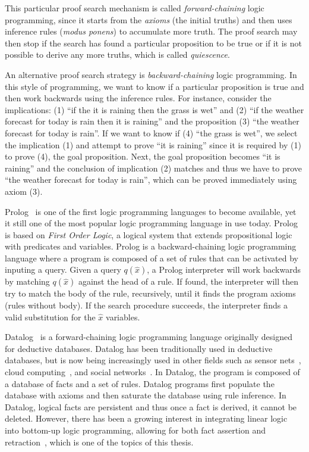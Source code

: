 This particular proof search mechanism is called \emph{forward-chaining} logic
programming, since it starts from the \emph{axioms} (the initial truths) and
then uses inference rules (\emph{modus ponens}) to accumulate more truth. The
proof search may then stop if the search has found a particular proposition to
be true or if it is not possible to derive any more truths, which is called
\emph{quiescence}.

An alternative proof search strategy is \emph{backward-chaining} logic
programming. In this style of programming, we want to know if a particular
proposition is true and then work backwards using the inference rules. For
instance, consider the implications: (1) ``if the it is raining then the grass
is wet'' and (2) ``if the weather forecast for today is rain then it is raining''
and the proposition (3) ``the weather forecast for today is rain''. If we want
to know if (4) ``the grass is wet'', we select the implication (1) and attempt to prove
``it is raining'' since it is required by (1) to prove (4), the goal
proposition. Next, the goal proposition becomes ``it is raining'' and the
conclusion of implication (2) matches and thus we have to prove ``the weather
forecast for today is rain'', which can be proved immediately using axiom (3).

Prolog~\cite{Colmerauer:1993:BP:154766.155362} is one of the first logic
programming languages to become available, yet it still one of the most popular
logic programming language in use today. Prolog is based on \emph{First Order
Logic}, a logical system that extends propositional logic with predicates and
variables. Prolog is a backward-chaining logic programming language where a
program is composed of a set of rules that can be activated by inputing a query.
Given a query $q(\hat{x})$, a Prolog interpreter will work backwards by matching
$q(\hat{x})$ against the head of a rule. If found, the interpreter will then try
to match the body of the rule, recursively, until it finds the program axioms
(rules without body). If the search procedure succeeds, the interpreter finds a
valid substitution for the $\hat{x}$ variables.

Datalog~\cite{Ramakrishnan93asurvey,Ullman:1990:PDK:533142} is a
forward-chaining logic programming language originally designed for deductive
databases. Datalog has been traditionally used in deductive databases, but is
now being increasingly used in other fields such as sensor
nets~\cite{Chu:2007:DID:1322263.1322281}, cloud computing~\cite{alvaro:boom},
and social networks~\cite{Seo:2013:DSD:2556549.2556572}.  In Datalog, the
program is composed of a database of facts and a set of rules.  Datalog programs
first populate the database with axioms and then saturate the database using
rule inference. In Datalog, logical facts are persistent and thus once a fact is
derived, it cannot be deleted. However, there has been a growing interest in
integrating linear logic~\cite{girard-87} into bottom-up logic programming,
allowing for both fact assertion and
retraction~\cite{Chang03ajudgmental,Lopez:2005:MCL:1069774.1069778,simmons-lla,cruz-iclp14},
which is one of the topics of this thesis.

